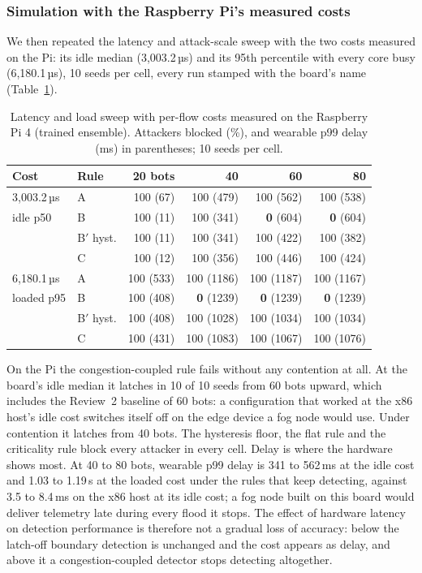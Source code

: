 \subsubsection{Simulation with the Raspberry Pi's measured costs}
We then repeated the latency and attack-scale sweep with the two costs measured on the Pi: its idle median (3,003.2\,µs) and its 95th percentile with every core busy (6,180.1\,µs), 10 seeds per cell, every run stamped with the board's name (Table~\ref{tab:pimeasured}).

\begin{table}[t]
\caption{Latency and load sweep with per-flow costs measured on the Raspberry Pi 4 (trained ensemble). Attackers blocked (\%), and wearable p99 delay (ms) in parentheses; 10 seeds per cell.}
\label{tab:pimeasured}
\centering\footnotesize
\begin{tabular}{@{}llrrrr@{}}
\toprule
\textbf{Cost} & \textbf{Rule} & \textbf{20 bots} & \textbf{40} & \textbf{60} & \textbf{80} \\
\midrule
3,003.2\,µs & A & 100 (67) & 100 (479) & 100 (562) & 100 (538) \\
idle p50 & B & 100 (11) & 100 (341) & \textbf{0} (604) & \textbf{0} (604) \\
 & B$'$ hyst. & 100 (11) & 100 (341) & 100 (422) & 100 (382) \\
 & C & 100 (12) & 100 (356) & 100 (446) & 100 (424) \\
\midrule
6,180.1\,µs & A & 100 (533) & 100 (1186) & 100 (1187) & 100 (1167) \\
loaded p95 & B & 100 (408) & \textbf{0} (1239) & \textbf{0} (1239) & \textbf{0} (1239) \\
 & B$'$ hyst. & 100 (408) & 100 (1028) & 100 (1034) & 100 (1034) \\
 & C & 100 (431) & 100 (1083) & 100 (1067) & 100 (1076) \\
\bottomrule
\end{tabular}
\end{table}

\noindent On the Pi the congestion-coupled rule fails without any contention at all. At the board's idle median it latches in 10 of 10 seeds from 60 bots upward, which includes the Review~2 baseline of 60 bots: a configuration that worked at the x86 host's idle cost switches itself off on the edge device a fog node would use. Under contention it latches from 40 bots. The hysteresis floor, the flat rule and the criticality rule block every attacker in every cell. Delay is where the hardware shows most. At 40 to 80 bots, wearable p99 delay is 341 to 562\,ms at the idle cost and 1.03 to 1.19\,s at the loaded cost under the rules that keep detecting, against 3.5 to 8.4\,ms on the x86 host at its idle cost; a fog node built on this board would deliver telemetry late during every flood it stops. The effect of hardware latency on detection performance is therefore not a gradual loss of accuracy: below the latch-off boundary detection is unchanged and the cost appears as delay, and above it a congestion-coupled detector stops detecting altogether.
